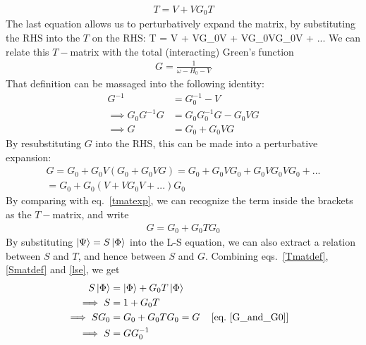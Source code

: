 \documentclass[12pt,twoside]{article}
\numberwithin{equation}{section}
\begin{document}
\begin{equation}\begin{aligned}
	\label{TinG}
	T = V + V G_0 T
\end{aligned}\end{equation}
The last equation allows us to perturbatively expand the  matrix, by substituting the RHS into the \(T\) on the RHS:
\beq
T = V + VG_0V + VG_0VG_0V + ...
\label{tmatexp}
\eeq
We can relate this \(T-\)matrix with the total (interacting) Green's function
\begin{equation}\begin{aligned}
	G = \frac{1}{\omega - H_0 - V}
\end{aligned}\end{equation}
That definition can be massaged into the following identity:
\begin{equation}\begin{aligned}
	\label{GinVG}
	G^{-1} &= G_0^{-1} - V\\
	\implies G_0 G^{-1} G &= G_0 G_0^{-1} G - G_0 V G\\
	\implies G &= G_0 + G_0 V G
\end{aligned}\end{equation}
By resubstituting \(G\) into the RHS, this can be made into a perturbative expansion:
\begin{equation}\begin{aligned}
	G = G_0 + G_0 V \left(G_0 + G_0 V G\right) = G_0 + G_0 V G_0 + G_0 V G_0 V G_0 + ... \\
	= G_0 + G_0 \left( V + V G_0 V + ... \right) G_0
\end{aligned}\end{equation}
By comparing with eq.~\ref{tmatexp}, we can recognize the term inside the brackets as the \(T-\)matrix, and write
\begin{equation}\begin{aligned}
	G = G_0 + G_0 T G_0
	\label{G_and_G0}
\end{aligned}\end{equation}
By substituting \(\ket{\Psi} = S\ket{\Phi}\) into the L-S equation, we can also extract a relation between \(S\) and \(T\), and hence between \(S\) and \(G\). Combining eqs.~\ref{Tmatdef},\ref{Smatdef} and \ref{lse}, we get
\begin{align}
	S\ket{\Phi} &= \ket{\Phi} + G_0 T\ket{\Phi}\\
	\implies S &= 1 + G_0 T\\
	\implies SG_0 &= G_0 + G_0 T G_0 = G && \left[\text{eq.~\ref{G_and_G0}}\right]\\
	\implies S &= G  G_0^{-1} \label{SinG}
\end{align}
\end{document}
